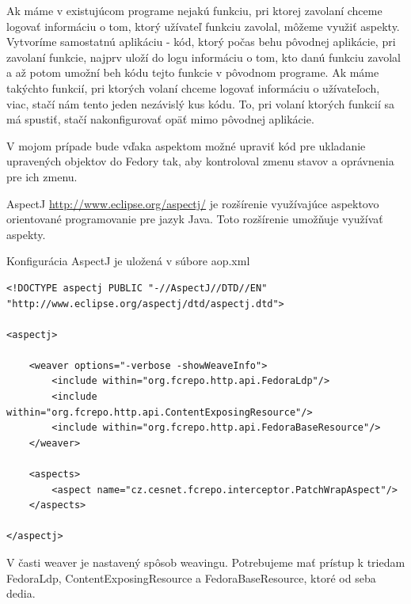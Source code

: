 \documentclass[thesis=M,slovak]{FITthesis}[2013/05/06]
\begin{document}
Ak máme v existujúcom programe nejakú funkciu, pri ktorej zavolaní chceme logovať informáciu o tom, ktorý užívateľ funkciu zavolal, môžeme využiť aspekty. Vytvoríme samostatnú aplikáciu - kód, ktorý počas behu pôvodnej aplikácie, pri zavolaní funkcie, najprv uloží do logu informáciu o tom, kto danú funkciu zavolal a až potom umožní beh kódu tejto funkcie v pôvodnom programe. Ak máme takýchto funkcií, pri ktorých volaní chceme logovať informáciu o užívateľoch, viac, stačí nám tento jeden nezávislý kus kódu. To, pri volaní ktorých funkcií sa má spustiť, stačí nakonfigurovať opäť mimo pôvodnej aplikácie.

V mojom prípade bude vďaka aspektom možné upraviť kód pre ukladanie upravených objektov do Fedory tak, aby kontroloval zmenu stavov a oprávnenia pre ich zmenu.

AspectJ \url{http://www.eclipse.org/aspectj/} je rozšírenie využívajúce aspektovo orientované programovanie pre jazyk Java. Toto rozšírenie umožňuje využívať aspekty.

Konfigurácia AspectJ je uložená v súbore aop.xml
\lstset{language=XML}
\begin{lstlisting}[frame=single] 
<!DOCTYPE aspectj PUBLIC "-//AspectJ//DTD//EN" "http://www.eclipse.org/aspectj/dtd/aspectj.dtd">

<aspectj>

    <weaver options="-verbose -showWeaveInfo">
        <include within="org.fcrepo.http.api.FedoraLdp"/>
        <include within="org.fcrepo.http.api.ContentExposingResource"/>
        <include within="org.fcrepo.http.api.FedoraBaseResource"/>
    </weaver>

    <aspects>
        <aspect name="cz.cesnet.fcrepo.interceptor.PatchWrapAspect"/>
    </aspects>

</aspectj>
\end{lstlisting}
V časti weaver je nastavený spôsob weavingu. Potrebujeme mať prístup k triedam FedoraLdp, ContentExposingResource a FedoraBaseResource, ktoré od seba dedia.
\end{document}
